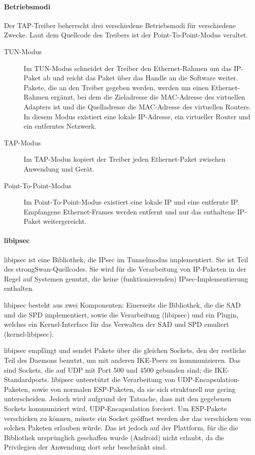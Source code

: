 \paragraph{Betriebsmodi}
Der TAP-Treiber beherrscht drei verschiedene Betriebsmodi für verschiedene Zwecke.
Laut dem Quellcode des Treibers ist der Point-To-Point-Modus veraltet.
\begin{description}
\item [TUN-Modus] Im TUN-Modus schneidet der Treiber den Ethernet-Rahmen um das 
IP-Paket ab und reicht das Paket über das Handle an die Software weiter. 
Pakete, die an den Treiber gegeben werden, werden um einen Ethernet-Rahmen
ergänzt, bei dem die Zieladresse die MAC-Adresse des virtuellen Adapters ist 
und die Quelladresse die MAC-Adresse des virtuellen Routers.
In diesem Modus existiert eine lokale IP-Adresse, ein virtueller Router und 
ein entferntes Netzwerk.
\item [TAP-Modus] Im TAP-Modus kopiert der Treiber jeden Ethernet-Paket zwischen 
Anwendung und Gerät.
\item [Point-To-Point-Modus] Im Point-To-Point-Modus existiert eine lokale IP 
und eine entfernte IP. Empfangene Ethernet-Frames werden entfernt und nur
das enthaltene IP-Paket weitergereicht.
\end{description}

\paragraph{libipsec}
libipsec ist eine Bibliothek, die IPsec im Tunnelmodus implementiert.
Sie ist Teil des strongSwan-Quellcodes. Sie wird für die Verarbeitung von IP-Paketen
in der Regel auf Systemen genutzt, die keine (funktionierenden) IPsec-Implementierung
enthalten.

libipsec besteht aus zwei Komponenten: Einerseits die Bibliothek, die die SAD und die SPD
implementiert, sowie die Verarbeitung (libipsec) und ein Plugin, welches ein Kernel-Interface
für das Verwalten der \ac{SAD} und \ac{SPD} emuliert (kernel-libipsec).

libipsec empfängt und sendet Pakete über die gleichen Sockets, den der restliche Teil
des Daemons benutzt, um mit anderen IKE-Peers zu kommunizieren. Das sind Sockets,
die auf UDP mit Port 500 und 4500 gebunden sind; die IKE-Standardports.
libipsec unterstützt die Verarbeitung von UDP-Encapsulation-Paketen, sowie von normalen ESP-Paketen,
da sie sich strukturell nur gering unterscheiden. Jedoch wird aufgrund der Tatsache,
dass mit den gegebenen Sockets kommuniziert wird, UDP-Encapsulation forciert.
Um ESP-Pakete verschicken zu können, müsste ein Socket geöffnet werden der das
verschicken von solchen Paketen erlauben würde. Das ist jedoch auf der Plattform,
für die die Bibliothek ursprünglich geschaffen wurde (Android) nicht erlaubt, da
die Privilegien der Anwendung dort sehr beschränkt sind.

